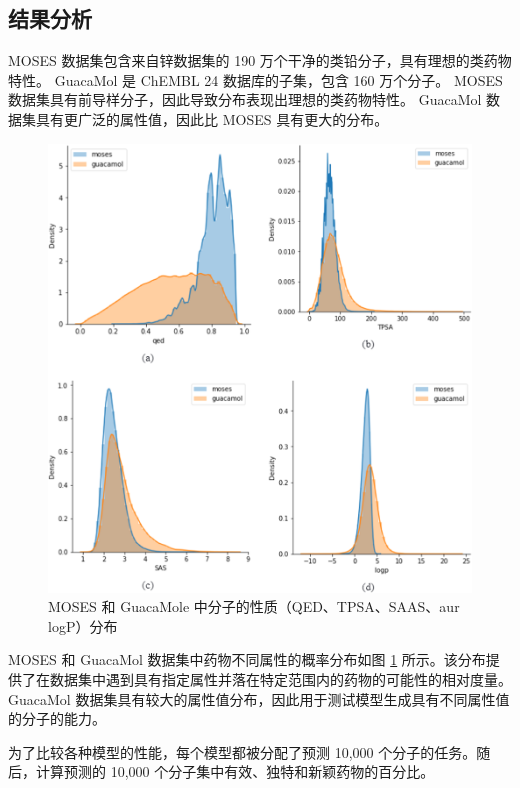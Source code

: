 \subsection{结果分析}

MOSES 数据集包含来自锌数据集的 190 万个干净的类铅分子，具有理想的类药物特性。 GuacaMol 是 ChEMBL 24 数据库的子集，包含 160 万个分子。 MOSES 数据集具有前导样分子，因此导致分布表现出理想的类药物特性。 GuacaMol 数据集具有更广泛的属性值，因此比 MOSES 具有更大的分布。

\begin{figure}[H]
  \centering
  \includegraphics[width=\linewidth]{figures/2.png}
  \caption{MOSES 和 GuacaMole 中分子的性质（QED、TPSA、SAAS、aur logP）分布}
  \label{fig:2}
\end{figure}

MOSES 和 GuacaMol 数据集中药物不同属性的概率分布如图 \ref{fig:2} 所示。该分布提供了在数据集中遇到具有指定属性并落在特定范围内的药物的可能性的相对度量。 GuacaMol 数据集具有较大的属性值分布，因此用于测试模型生成具有不同属性值的分子的能力。

为了比较各种模型的性能，每个模型都被分配了预测 10,000 个分子的任务。随后，计算预测的 10,000 个分子集中有效、独特和新颖药物的百分比。

